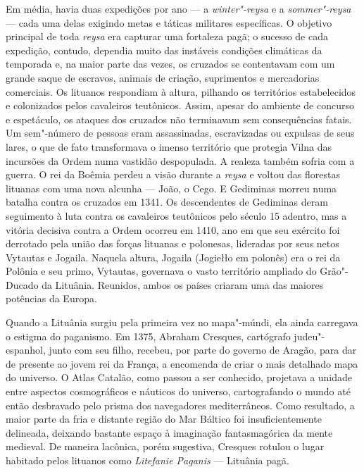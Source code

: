 Em média, havia duas expedições por ano --- a \textit{winter"-reysa} e a
\textit{sommer"-reysa} --- cada uma delas exigindo metas e táticas militares
específicas. O objetivo principal de toda \textit{reysa} era capturar uma
fortaleza pagã; o sucesso de cada expedição, contudo, dependia muito das
instáveis condições climáticas da temporada e, na maior parte das vezes,
os cruzados se contentavam com um grande saque de escravos, animais de
criação, suprimentos e mercadorias comerciais. Os lituanos respondiam à
altura, pilhando os territórios estabelecidos e colonizados pelos
cavaleiros teutônicos. Assim, apesar do ambiente de concurso e
espetáculo, os ataques dos cruzados não terminavam sem consequências
fatais. Um sem"-número de pessoas eram assassinadas, escravizadas ou
expulsas de seus lares, o que de fato transformava o imenso território
que protegia Vilna das incursões da Ordem numa vastidão despopulada. A
realeza também sofria com a guerra. O rei da Boêmia perdeu a visão
durante a \textit{reysa} e voltou das florestas lituanas com uma nova
alcunha --- João, o Cego. E Gediminas morreu numa batalha contra os
cruzados em 1341. Os descendentes de Gediminas deram seguimento à luta
contra os cavaleiros teutônicos pelo século 15 adentro, mas a vitória
decisiva contra a Ordem ocorreu em 1410, ano em que seu exército foi
derrotado pela união das forças lituanas e polonesas, lideradas por seus
netos Vytautas e Jogaila. Naquela altura, Jogaila (Jogiełło em polonês)
era o rei da Polônia e seu primo, Vytautas, governava o vasto território
ampliado do Grão"-Ducado da Lituânia. Reunidos, ambos os países criaram
uma das maiores potências da Europa.

Quando a Lituânia surgiu pela primeira vez no mapa"-múndi, ela ainda
carregava o estigma do paganismo. Em 1375, Abraham Cresques, cartógrafo
judeu"-espanhol, junto com seu filho, recebeu, por parte do governo de
Aragão, para dar de presente ao jovem rei da França, a encomenda de
criar o mais detalhado mapa do universo. O Atlas Catalão, como passou a
ser conhecido, projetava a unidade entre aspectos cosmográficos e
náuticos do universo, cartografando o mundo até então desbravado pelo
prisma dos navegadores mediterrâneos. Como resultado, a maior parte da
fria e distante região do Mar Báltico foi insuficientemente delineada,
deixando bastante espaço à imaginação fantasmagórica da mente medieval.
De maneira lacônica, porém sugestiva, Cresques rotulou o lugar habitado
pelos lituanos como \textit{Litefanie Paganis} --- Lituânia pagã.

